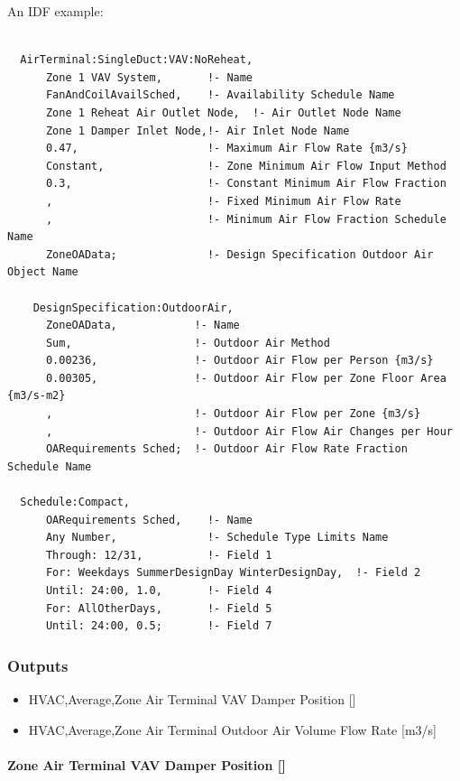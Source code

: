 An IDF example:

\begin{lstlisting}

  AirTerminal:SingleDuct:VAV:NoReheat,
      Zone 1 VAV System,       !- Name
      FanAndCoilAvailSched,    !- Availability Schedule Name
      Zone 1 Reheat Air Outlet Node,  !- Air Outlet Node Name
      Zone 1 Damper Inlet Node,!- Air Inlet Node Name
      0.47,                    !- Maximum Air Flow Rate {m3/s}
      Constant,                !- Zone Minimum Air Flow Input Method
      0.3,                     !- Constant Minimum Air Flow Fraction
      ,                        !- Fixed Minimum Air Flow Rate
      ,                        !- Minimum Air Flow Fraction Schedule Name
      ZoneOAData;              !- Design Specification Outdoor Air Object Name

    DesignSpecification:OutdoorAir,
      ZoneOAData,            !- Name
      Sum,                   !- Outdoor Air Method
      0.00236,               !- Outdoor Air Flow per Person {m3/s}
      0.00305,               !- Outdoor Air Flow per Zone Floor Area {m3/s-m2}
      ,                      !- Outdoor Air Flow per Zone {m3/s}
      ,                      !- Outdoor Air Flow Air Changes per Hour
      OARequirements Sched;  !- Outdoor Air Flow Rate Fraction Schedule Name

  Schedule:Compact,
      OARequirements Sched,    !- Name
      Any Number,              !- Schedule Type Limits Name
      Through: 12/31,          !- Field 1
      For: Weekdays SummerDesignDay WinterDesignDay,  !- Field 2
      Until: 24:00, 1.0,       !- Field 4
      For: AllOtherDays,       !- Field 5
      Until: 24:00, 0.5;       !- Field 7
\end{lstlisting}

\subsubsection{Outputs}\label{outputs-5}

\begin{itemize}
\item
  HVAC,Average,Zone Air Terminal VAV Damper Position {[]}
\item
  HVAC,Average,Zone Air Terminal Outdoor Air Volume Flow Rate {[}m3/s{]}
\end{itemize}

\paragraph{\texorpdfstring{Zone Air Terminal VAV Damper Position {[]}}{Zone Air Terminal VAV Damper Position }}\label{zone-air-terminal-vav-damper-position-3}

